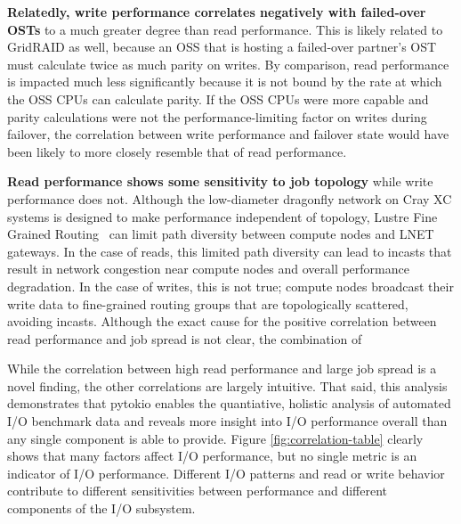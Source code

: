 \textbf{Relatedly, write performance correlates negatively with failed-over OSTs} to a much greater degree than read performance.
This is likely related to GridRAID as well, because an OSS that is hosting a failed-over partner's OST must calculate twice as much parity on writes.
By comparison, read performance is impacted much less significantly because it is not bound by the rate at which the OSS CPUs can calculate parity.
If the OSS CPUs were more capable and parity calculations were not the performance-limiting factor on writes during failover, the correlation between write performance and failover state would have been likely to more closely resemble that of read performance.

\textbf{Read performance shows some sensitivity to job topology} while write performance does not.
Although the low-diameter dragonfly network on Cray XC systems is designed to make performance independent of topology, Lustre Fine Grained Routing~\cite{Dillow2011} can limit path diversity between compute nodes and LNET gateways.
In the case of reads, this limited path diversity can lead to incasts that result in network congestion near compute nodes and overall performance degradation.
In the case of writes, this is not true; compute nodes broadcast their write data to fine-grained routing groups that are topologically scattered, avoiding incasts.
Although the exact cause for the positive correlation between read performance and job spread is not clear, the combination of 

While the correlation between high read performance and large job spread is a novel finding, the other correlations are largely intuitive.
That said, this analysis demonstrates that pytokio enables the quantiative, holistic analysis of automated I/O benchmark data and reveals more insight into I/O performance overall than any single component is able to provide.
Figure \ref{fig:correlation-table} clearly shows that many factors affect I/O performance, but no single metric is an indicator of I/O performance.
Different I/O patterns and read or write behavior contribute to different sensitivities between performance and different components of the I/O subsystem.